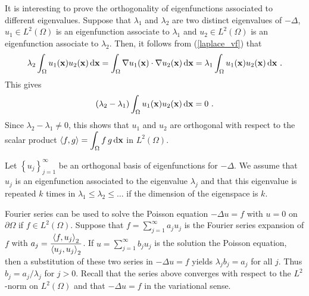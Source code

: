 It is interesting to prove the orthogonality of eigenfunctions
associated to different eigenvalues.  Suppose that $\lambda_1$ and
$\lambda_2$ are two distinct eigenvalues of $-\Delta$,
$\displaystyle u_1 \in L^2(\Omega)$ is an eigenfunction associate to 
$\lambda_1$ and $\displaystyle u_2 \in L^2(\Omega)$ is an
eigenfunction associate to $\lambda_2$.  Then, it follows from
(\ref{laplace_vf}) that
\[
\lambda_2 \int_{\Omega} u_1(\VEC{x}) u_2(\VEC{x}) \dx{\VEC{x}} =
\int_{\Omega} \nabla u_1(\VEC{x}) \cdot \nabla u_2(\VEC{x}) \dx{\VEC{x}}
= \lambda_1 \int_{\Omega} u_1(\VEC{x}) u_2(\VEC{x}) \dx{\VEC{x}} \ .
\]
This gives
\[
\left( \lambda_2 - \lambda_1 \right) \int_{\Omega} u_1(\mathbf{x})
u_2(\mathbf{x}) \,\mathrm{d}{\mathbf{x}} = 0 \ .
\]
Since $\lambda_2 - \lambda_1 \neq 0$, this shows that $u_1$ and $u_2$
are orthogonal with respect to the scalar product
$\displaystyle \left\langle{f} , {g}\right\rangle = \int_{\Omega} f\, g \,\mathrm{d}{\mathbf{x}}$
in $\displaystyle L^2(\Omega)$.

Let $\displaystyle \left\{ u_j \right\}_{j=1}^\infty$ be an orthogonal basis of
eigenfunctions for $-\Delta$.  We assume that $u_j$ is an
eigenfunction associated to the eigenvalue $\lambda_j$ and that this
eigenvalue is repeated $k$ times in
$\lambda_1 \leq \lambda_2 \leq \ldots$ if the dimension of the
eigenspace is $k$.

\begin{egg}
Fourier series can be used to solve the Poisson equation
$-\Delta u = f$ with $u =0$ on $\partial \Omega$
if $\displaystyle f \in L^2(\Omega)$.  Suppose that
$\displaystyle f = \sum_{j=1}^\infty a_j u_j$ is the Fourier series
expansion of $f$ with
$\displaystyle a_j = \frac{\left\langle{f} , {u_j}\right\rangle_2}{\left\langle{u_j} , {u_j}\right\rangle_2}$.  If 
$\displaystyle u = \sum_{j=1}^\infty b_j u_j$ is the solution
the Poisson equation, then a substitution of these two series in
$-\Delta u = f$ yields $\lambda_j b_j = a_j$ for all $j$.
Thus $b_j = a_j/\lambda_j$ for $j>0$.   Recall that the
series above converges with respect to the $\displaystyle L^2$-norm on
$\displaystyle L^2(\Omega)$ and that $-\Delta u = f$ in the variational sense.
\end{egg}

